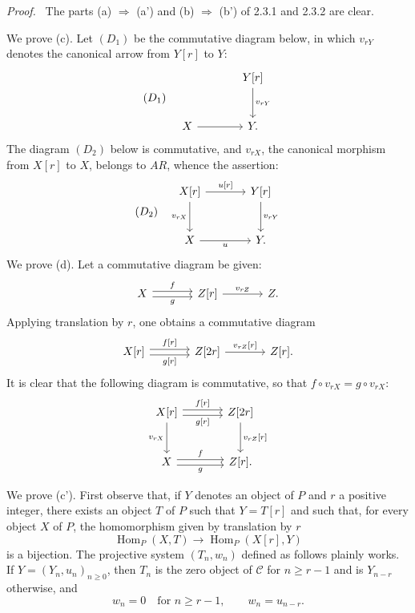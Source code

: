 \documentclass[11pt]{article}
\newenvironment{prooftext}[1][Proof]{\par\noindent\emph{#1.}\ }{\par\medskip}
\DeclareMathOperator{\Hom}{Hom}
\providecommand{\Hom}{\operatorname{Hom}}
\providecommand{\cC}{\mathcal C}
\providecommand{\cC}{\mathcal C}
\providecommand{\Hom}{\operatorname{Hom}}
\begin{document}
\begin{prooftext}[Proof]
The parts (a) $\Rightarrow$ (a') and (b) $\Rightarrow$ (b') of 2.3.1 and 2.3.2 are clear.

We prove (c). Let $(D_1)$ be the commutative diagram below, in which $v_{rY}$ denotes the canonical arrow from $Y[r]$ to $Y$:
\[
(D_1)\quad
\begin{tikzcd}[column sep=large,row sep=large]
& Y[r] \arrow[d,"{v_{rY}}"]\\
X \arrow[r] & Y .
\end{tikzcd}
\]
The diagram $(D_2)$ below is commutative, and $v_{rX}$, the canonical morphism from $X[r]$ to $X$, belongs to $AR$, whence the assertion:
\[
(D_2)\quad
\begin{tikzcd}[column sep=large,row sep=large]
X[r] \arrow[r,"{u[r]}"] \arrow[d,"{v_{rX}}"'] & Y[r] \arrow[d,"{v_{rY}}"]\\
X \arrow[r,"u"'] & Y .
\end{tikzcd}
\]
We prove (d). Let a commutative diagram be given:
\[
\begin{tikzcd}[column sep=large]
X \arrow[r,shift left,"f"] \arrow[r,shift right,"g"'] & Z[r] \arrow[r,"{v_{rZ}}"] & Z .
\end{tikzcd}
\]
Applying translation by $r$, one obtains a commutative diagram
\[
\begin{tikzcd}[column sep=large]
X[r] \arrow[r,shift left,"{f[r]}"] \arrow[r,shift right,"{g[r]}"'] & Z[2r] \arrow[r,"{v_{rZ}[r]}"] & Z[r].
\end{tikzcd}
\]
It is clear that the following diagram is commutative, so that $f\circ v_{rX}=g\circ v_{rX}$:
\[
\begin{tikzcd}[column sep=large,row sep=large]
X[r] \arrow[r,shift left,"{f[r]}"] \arrow[r,shift right,"{g[r]}"'] \arrow[d,"{v_{rX}}"'] & Z[2r] \arrow[d,"{v_{rZ}[r]}"]\\
X \arrow[r,shift left,"f"] \arrow[r,shift right,"g"'] & Z[r] .
\end{tikzcd}
\]

We prove (c'). First observe that, if $Y$ denotes an object of $P$ and $r$ a positive integer, there exists an object $T$ of $P$ such that $Y=T[r]$ and such that, for every object $X$ of $P$, the homomorphism given by translation by $r$
\[
\Hom_P(X,T)\longrightarrow\Hom_P(X[r],Y)
\]
is a bijection. The projective system $(T_n,w_n)$ defined as follows plainly works. If $Y=(Y_n,u_n)_{n\ge0}$, then $T_n$ is the zero object of $\cC$ for $n\ge r-1$ and is $Y_{n-r}$ otherwise, and
\[
w_n=0\quad\text{for }n\ge r-1,\qquad w_n=u_{n-r}.
\]


\end{prooftext}
\end{document}
